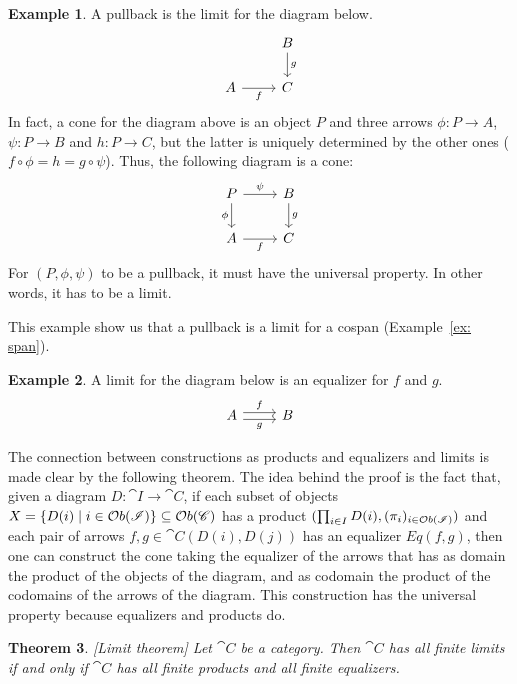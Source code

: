 \documentclass[a4paper, twoside,openright]{report}
\theoremstyle{plain}
\newtheorem{theorem}{Theorem}[section]
\theoremstyle{definition}
\newtheorem{example}[theorem]{Example}
\begin{document}
\begin{example}\label{ex:pb_as_limit}
    A pullback is the limit for the diagram below.
    \[
        \begin{tikzcd}
            & B \arrow[d, "g"] \\
            A \arrow[r, "f" swap] & C
        \end{tikzcd}
    \]
    In fact, a cone for the diagram above is an object $P$ and three arrows $\phi:P \rightarrow A$, $\psi: P \rightarrow B$ and $h: P \rightarrow C$, but the latter is uniquely determined by the other ones ($f \circ \phi = h = g \circ \psi$).
    Thus, the following diagram is a cone:
    \[
        \begin{tikzcd}
            P \arrow[r, "{\psi}"] \arrow[d, "{\phi}" swap] & B \arrow[d, "g"] \\
            A \arrow[r, "f" swap] & C
        \end{tikzcd}
    \]
    For $(P, \phi, \psi)$ to be a pullback, it must have the universal property. In other words, it has to be a limit.

    This example show us that a pullback is a limit for a cospan (Example~\ref{ex: span}).
\end{example}

\begin{example}\label{ex:equaliz_are_limits}
    A limit for the diagram below is an equalizer for $f$ and $g$.
    \[
        \begin{tikzcd}
            A \arrow[r, shift left, "f"] \arrow[r, shift right,"g"swap] & B
        \end{tikzcd}
    \]
\end{example}


The connection between constructions as products and equalizers and limits is made clear by the following theorem. The idea behind the proof is the fact that, given a diagram $D : \cat I \rightarrow \cat C$, if each subset of objects $X = \{D(i) \mid i \in \mathcal{O}b(\mathscr{I})\} \subseteq \mathcal{O}b(\mathscr{C})$ has a product $(\prod_{i \in I} D(i), (\pi_i)_{i \in \mathcal{O}b( \mathscr{I})})$ and each pair of arrows $f, g \in \cat C (D(i), D(j))$ has an equalizer $Eq(f, g)$, then one can construct the cone taking the equalizer of the arrows that has as domain the product of the objects of the diagram, and as codomain the product of the codomains of the arrows of the diagram. This construction has the universal property because equalizers and products do.

\begin{theorem}\label{th:limit}[Limit theorem]
    Let $\cat C$ be a category. Then $\cat C$ has all finite limits if and only if $\cat C$ has all finite products and all finite equalizers.
\end{theorem}
\end{document}
